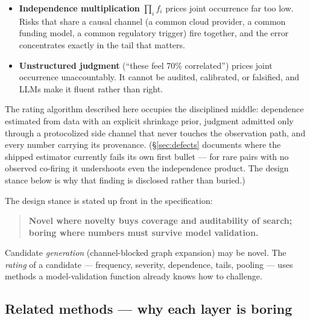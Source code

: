 \documentclass[11pt]{article}
\begin{document}
\begin{itemize}[leftmargin=1.4em]
\item \textbf{Independence multiplication} $\prod_i f_i$ prices joint
  occurrence far too low. Risks that share a causal channel (a common cloud
  provider, a common funding model, a common regulatory trigger) fire
  together, and the error concentrates exactly in the tail that matters.
\item \textbf{Unstructured judgment} (``these feel 70\% correlated'') prices
  joint occurrence unaccountably. It cannot be audited, calibrated, or
  falsified, and LLMs make it fluent rather than right.
\end{itemize}

The rating algorithm described here occupies the disciplined middle:
dependence estimated from data with an explicit shrinkage prior, judgment
admitted only through a protocolized side channel that never touches the
observation path, and every number carrying its provenance.
(\S\ref{sec:defects} documents where the shipped estimator currently fails
its own first bullet --- for rare pairs with no observed co-firing it
undershoots even the independence product. The design stance below is why
that finding is disclosed rather than buried.)

The design stance is stated up front in the specification:

\begin{quote}
\textbf{Novel where novelty buys coverage and auditability of search; boring
where numbers must survive model validation.}
\end{quote}

Candidate \emph{generation} (channel-blocked graph expansion) may be novel.
The \emph{rating} of a candidate --- frequency, severity, dependence, tails,
pooling --- uses methods a model-validation function already knows how to
challenge.

\subsection{Related methods --- why each layer is boring}
\label{sec:related}
\end{document}
